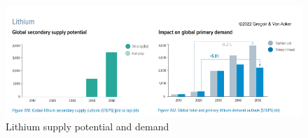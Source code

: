 \documentclass[../summary.tex]{subfiles}
\begin{document}
\begin{figure}[H]
	\centering
	\includegraphics[width=1\linewidth]{../images/Lithium_supply_potential_and_demand}
	\caption{Lithium supply potential and demand}
	\label{fig:lithiumsupplypotentialanddemand}
\end{figure}
\end{document}
